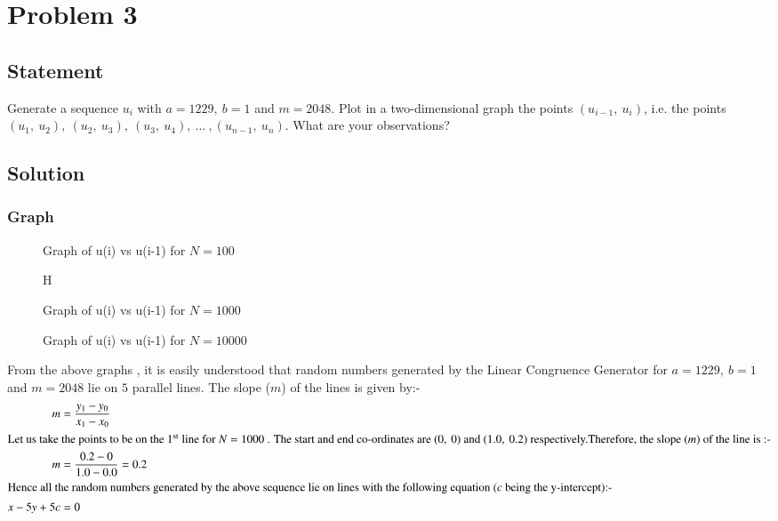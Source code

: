 \documentclass[10pt]{article}
\begin{document}
\section{Problem 3}

\subsection{Statement}

Generate a sequence $u_i$ with $a = 1229,\: b = 1$ and $m = 2048$. Plot in a two-dimensional graph the points $(u_{i-1},\: u_i)$, i.e. the points $(u_1,\: u_2),\: (u_2,\: u_3),\: (u_3,\: u_4),\: \ldots\:, (u_{n-1},\: u_n)$. What are your observations?

\subsection{Solution}

\subsubsection{Graph}
	\begin{figure}[H]
       	     	\centering
		\caption{Graph of u(i) vs u(i-1) for $ N = 100 $}	
		\label{3:q3_f1_a}
	\end{figure}
	\begin{figure}{H}
       	     	\centering
		\caption{Graph of u(i) vs u(i-1) for $ N = 1000 $}	
		\label{3:q3_f1_b}
	\end{figure}
	\begin{figure}[H]
       	     	\centering
		\caption{Graph of u(i) vs u(i-1) for $ N = 10000 $}	
		\label{3:q3_f1_c}
	\end{figure}
	


From the above graphs , it is easily understood that random numbers generated by the Linear Congruence Generator for $a = 1229,\: b = 1$ and $m = 2048$ lie on $5$ parallel lines. The slope ($m$) of the lines is given by:-
\begin{align}
m &= \frac{y_1 - y_0}{x_1 - x_0} \\
\intertext{Let us take the points to be on the 1$^{\textrm{st}}$ line for $N=1000$ . The start and end co-ordinates are $(0,\: 0)$ and $(1.0,\: 0.2)$ respectively.Therefore, the slope ($m$) of the line is :-}
m &= \frac{0.2 - 0}{1.0 - 0.0} = 0.2 \\
\intertext{Hence all the random numbers generated by the above sequence lie on lines with the following equation ($c$ being the y-intercept):-}
x - 5y + 5c &= 0
\end{align}
\end{document}

